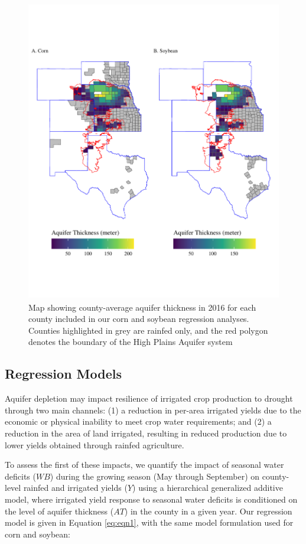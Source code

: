 \documentclass[
]{article}
\begin{document}
\begin{figure}[H]

{\centering \includegraphics[width=6in,height=500px,]{../../Figures/g_map} 

}

\caption{Map showing county-average aquifer thickness in 2016 for each county included in our corn and soybean regression analyses. Counties highlighted in grey are rainfed only, and the red polygon denotes the boundary of the High Plains Aquifer system}\label{fig:sat-map}
\end{figure}

\hypertarget{regression-models}{%
\subsection{Regression Models}\label{regression-models}}

Aquifer depletion may impact resilience of irrigated crop production to drought through two main channels: (1) a reduction in per-area irrigated yields due to the economic or physical inability to meet crop water requirements; and (2) a reduction in the area of land irrigated, resulting in reduced production due to lower yields obtained through rainfed agriculture.

To assess the first of these impacts, we quantify the impact of seasonal water deficits (\(WB\)) during the growing season (May through September) on county-level rainfed and irrigated yields (\(Y\)) using a hierarchical generalized additive model, where irrigated yield response to seasonal water deficits is conditioned on the level of aquifer thickness (\(AT\)) in the county in a given year. Our regression model is given in Equation \eqref{eq:eqn1}, with the same model formulation used for corn and soybean:
\end{document}
